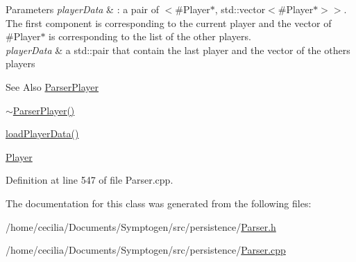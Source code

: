 \begin{DoxyParams}{Parameters}
{\em player\-Data} & \-: a pair of $<$\#\-Player$\ast$, std\-::vector$<$\#\-Player$\ast$$>$$>$. The first component is corresponding to the current player and the vector of \#\-Player$\ast$ is corresponding to the list of the other players.\\
\hline
{\em player\-Data} & a std\-::pair that contain the last player and the vector of the others players \\
\hline
\end{DoxyParams}
\begin{DoxySeeAlso}{See Also}
\hyperlink{class_symp_1_1_parser_player}{Parser\-Player} 

\hyperlink{class_symp_1_1_parser_player_a418e3d0bbe4bb706b6d66aeb903fb9c1}{$\sim$\-Parser\-Player()} 

\hyperlink{class_symp_1_1_parser_player_a5557f2a1924c72138e9a865e46e64d9a}{load\-Player\-Data()} 

\hyperlink{class_symp_1_1_player}{Player} 
\end{DoxySeeAlso}


Definition at line 547 of file Parser.\-cpp.



The documentation for this class was generated from the following files\-:\begin{DoxyCompactItemize}
\item 
/home/cecilia/\-Documents/\-Symptogen/src/persistence/\hyperlink{_parser_8h}{Parser.\-h}\item 
/home/cecilia/\-Documents/\-Symptogen/src/persistence/\hyperlink{_parser_8cpp}{Parser.\-cpp}\end{DoxyCompactItemize}

